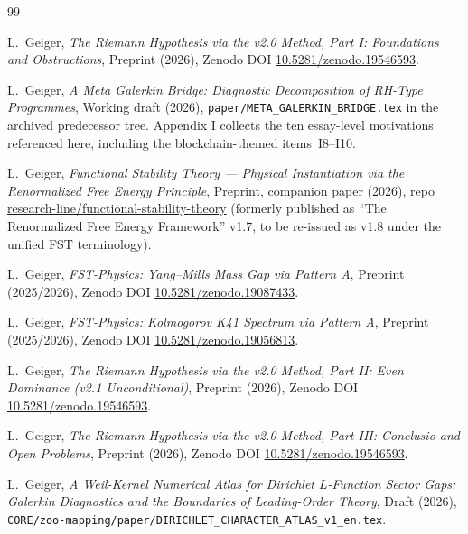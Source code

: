 \documentclass[11pt]{article}
\theoremstyle{definition}
\theoremstyle{remark}
\begin{document}
\begin{thebibliography}{99}


L.~Geiger, \emph{The Riemann Hypothesis via the v2.0 Method,
Part I: Foundations and Obstructions}, Preprint (2026), Zenodo DOI
\href{https://doi.org/10.5281/zenodo.19546593}{10.5281/zenodo.19546593}.

L.~Geiger, \emph{A Meta Galerkin Bridge: Diagnostic Decomposition
of RH-Type Programmes}, Working draft (2026),
\texttt{paper/META\_GALERKIN\_BRIDGE.tex} in the archived predecessor
tree. Appendix I collects
the ten essay-level motivations referenced here, including the
blockchain-themed items~I8--I10.

L.~Geiger, \emph{Functional Stability Theory --- Physical
Instantiation via the Renormalized Free Energy Principle},
Preprint, companion paper (2026), repo
\href{https://github.com/research-line/functional-stability-theory}{research-line/functional-stability-theory}
(formerly published as ``The Renormalized Free Energy Framework''
v1.7, to be re-issued as v1.8 under the unified FST terminology).

L.~Geiger, \emph{FST-Physics: Yang--Mills Mass Gap via Pattern A},
Preprint (2025/2026), Zenodo DOI
\href{https://doi.org/10.5281/zenodo.19087433}{10.5281/zenodo.19087433}.

L.~Geiger, \emph{FST-Physics: Kolmogorov K41 Spectrum via
Pattern A}, Preprint (2025/2026), Zenodo DOI
\href{https://doi.org/10.5281/zenodo.19056813}{10.5281/zenodo.19056813}.

L.~Geiger, \emph{The Riemann Hypothesis via the v2.0 Method,
Part II: Even Dominance (v2.1 Unconditional)}, Preprint (2026),
Zenodo DOI
\href{https://doi.org/10.5281/zenodo.19546593}{10.5281/zenodo.19546593}.

L.~Geiger, \emph{The Riemann Hypothesis via the v2.0 Method,
Part III: Conclusio and Open Problems}, Preprint (2026),
Zenodo DOI
\href{https://doi.org/10.5281/zenodo.19546593}{10.5281/zenodo.19546593}.

L.~Geiger, \emph{A Weil-Kernel Numerical Atlas for Dirichlet
$L$-Function Sector Gaps: Galerkin Diagnostics and the Boundaries of
Leading-Order Theory}, Draft (2026),
\texttt{CORE/zoo-mapping/paper/DIRICHLET\_CHARACTER\_ATLAS\_v1\_en.tex}.


\end{thebibliography}
\end{document}
